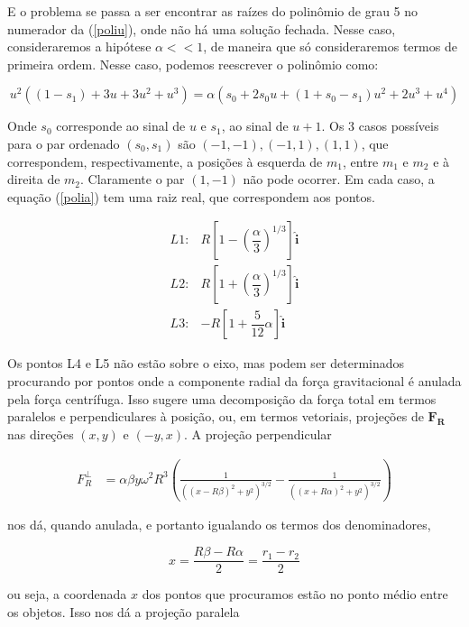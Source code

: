 E o problema se passa a ser encontrar as raízes do polinômio de grau 5 no numerador da (\ref{poliu}), onde não há uma solução fechada. Nesse caso, consideraremos a hipótese $\alpha << 1$, de maneira que só consideraremos termos de primeira ordem. Nesse caso, podemos reescrever o polinômio como:

\begin{equation}
u^2((1-s_1)+3u+3u^2+u^3) = \alpha(s_0 +2s_0u+(1+s_0-s_1)u^2+2u^3+u^4) \label{polia}
\end{equation}

Onde $s_0$ corresponde ao sinal de $u$ e $s_1$, ao sinal de $u+1$. Os 3 casos possíveis para o par ordenado $(s_0,s_1)$ são $(-1,-1), (-1,1), (1,1)$, que correspondem, respectivamente, a posições à esquerda de $m_1$, entre $m_1$ e $m_2$ e à direita de $m_2$. Claramente o par $(1,-1)$ não pode ocorrer. Em cada caso, a equação (\ref{polia}) tem uma raiz real, que correspondem aos pontos.

\begin{eqnarray}
L1: & R\left[1-\left(\dfrac{\alpha}{3}\right)^{1/3}\right]\mathbf{\hat{i}} \\
L2: & R\left[1+\left(\dfrac{\alpha}{3}\right)^{1/3}\right]\mathbf{\hat{i}} \\
L3: & -R\left[1 + \dfrac{5}{12}\alpha \right]\mathbf{\hat{i}}
\end{eqnarray}

Os pontos L4 e L5 não estão sobre o eixo, mas podem ser determinados procurando por pontos onde a componente radial da força gravitacional é anulada pela força centrífuga. Isso sugere uma decomposição da força total em termos paralelos e perpendiculares à posição, ou, em termos vetoriais, projeções de $\mathbf{F_R}$ nas direções $(x, y)$ e $(-y, x)$. A projeção perpendicular

\begin{align}
    F_R^\perp &= \alpha\beta y \omega^2R^3\left( \frac{1}{((x-R\beta)^2+y^2)^{3/2}} - \frac{1}{((x + R\alpha)^2+y^2)^{3/2}} \right)
\end{align}

nos dá, quando anulada, e portanto igualando os termos dos denominadores,

\begin{equation}
    x = \frac{R\beta - R\alpha}{2} = \frac{r_1 - r_2}{2}
\end{equation}

ou seja, a coordenada $x$ dos pontos que procuramos estão no ponto médio entre os objetos. Isso nos dá a projeção paralela

